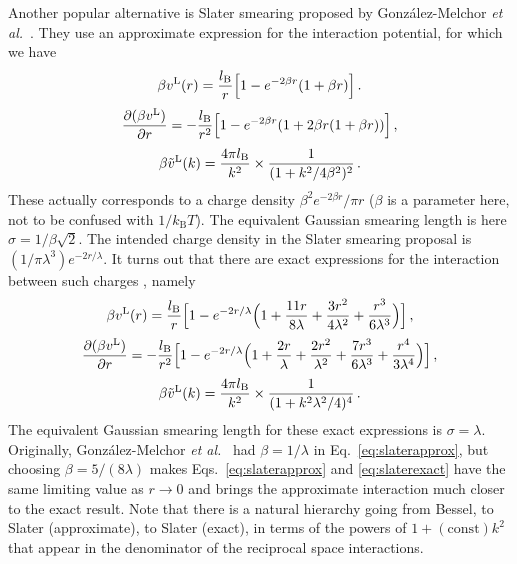 \documentclass[12pt,a4paper]{article}
\newcommand{\latin}[1]{\emph{#1}}
\newcommand{\etal}{\latin{et al.}}
\newcommand{\kB}{k_{\mathrm{B}}}
\newcommand{\kT}{\kB T}
\newcommand{\lr}{^{\mathrm{L}}}
\newcommand{\Eqref}[1]{Eq.~\eqref{#1}}
\newcommand{\Eqsref}[1]{Eqs.~\eqref{#1}}
\begin{document}
Another popular alternative is Slater smearing proposed by
Gonz\'alez-Melchor \etal\ \cite{GM+06}.  They use an approximate
expression for the interaction potential, for which we have
%
\begin{equation}
  \beta v\lr(r)=\frac{\lB}{r}\Bigl[1-e^{-2\beta r}(1+\beta r)\Bigr]\,.
  \label{eq:slaterapprox}
\end{equation}
%
\begin{equation}
  \frac{\partial(\beta v\lr)}{\partial r}=
  -\frac{\lB}{r^2}\Bigl[1-e^{-2\beta r}(1+2\beta r(1+\beta r))\Bigr]\,,
\end{equation}
%
\begin{equation}
\beta {\tilde v}\lr(k)=\frac{4\pi\lB}{k^2}\times\frac{1}{(1+k^2/4\beta^2)^2}\,.
\end{equation}
%
These actually corresponds to a charge density $\beta^2 e^{-2\beta
  r}/\pi r$ ($\beta$ is a parameter here, not to be confused with
$1/\kT$). The equivalent Gaussian smearing length is here
$\sigma=1/\beta\sqrt{2}$.  The intended charge density in the Slater
smearing proposal is $(1/\pi\lambda^3)e^{-2r/\lambda}$.  It turns out
that there are exact expressions for the interaction between such
charges \cite{WV14}, namely
%
\begin{equation}
  \beta v\lr(r)=\frac{\lB}{r}\Bigl[1-e^{-2r/\lambda}\Bigl(
    1+\frac{11r}{8\lambda}+\frac{3r^2}{4\lambda^2}
    +\frac{r^3}{6\lambda^3}\Bigr)\Bigr]\,,\label{eq:slaterexact}
\end{equation}
%
\begin{equation}
  \frac{\partial(\beta v\lr)}{\partial r}=
  -\frac{\lB}{r^2}\Bigl[1-e^{-2r/\lambda}\Bigl(
    1+\frac{2r}{\lambda}+\frac{2r^2}{\lambda^2}
    +\frac{7r^3}{6\lambda^3}+\frac{r^4}{3\lambda^4}\Bigr)\Bigr]\,,
\end{equation}
%
\begin{equation}
\beta {\tilde v}\lr(k)=\frac{4\pi\lB}{k^2}\times\frac{1}{(1+k^2\lambda^2/4)^4}\,.
\end{equation}
%
The equivalent Gaussian smearing length for these exact expressions is
$\sigma=\lambda$.  Originally, Gon\-z\'a\-lez-Melchor
\etal\ \cite{GM+06} had $\beta=1/\lambda$ in \Eqref{eq:slaterapprox},
but choosing $\beta=5/(8\lambda)$ makes \Eqsref{eq:slaterapprox} and
\eqref{eq:slaterexact} have the same limiting value as $r\to0$ and
brings the approximate interaction much closer to the exact result.
Note that there is a natural hierarchy going from Bessel, to Slater
(approximate), to Slater (exact), in terms of the powers of
$1+(\mathrm{const})k^2$ that appear in the denominator of the
reciprocal space interactions.
\end{document}
